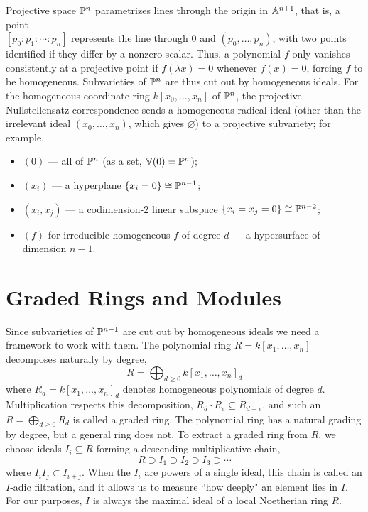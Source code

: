 \documentclass[12pt]{amsproc}
\begin{document}
    Projective space $\P^n$ parametrizes lines through the origin in $\A^{n+1}$, that is, a point \\ $[p_0: p_1: \cdots : p_{n}]$ represents the line through $0$ and $(p_0, \ldots, p_n)$, with two points identified if they differ by a nonzero scalar. Thus, a polynomial $f$ only vanishes consistently at a projective point if $f(\lambda x) = 0$ whenever $f(x) = 0$, forcing $f$ to be homogeneous. Subvarieties of $\P^n$ are thus cut out by homogeneous ideals. For the homogeneous coordinate ring $k[x_0, \ldots, x_n]$ of $\P^n$, the projective Nullstellensatz correspondence sends a homogeneous radical ideal (other than the irrelevant ideal $(x_0, \ldots, x_n)$, which gives $\varnothing$) to a projective subvariety; for example,
   \begin{itemize}[topsep=2pt,itemsep=1pt]
        \item $(0)$ --- all of $\P^n$ (as a set, $\V(0) = \P^n$);
        \item $(x_i)$ --- a hyperplane $\{x_i = 0\} \iso \P^{n-1}$;
        \item $(x_i, x_j)$ --- a codimension-$2$ linear subspace $\{x_i = x_j = 0\} \iso \P^{n-2}$;
        \item $(f)$ for irreducible homogeneous $f$ of degree $d$ --- a hypersurface of dimension $n-1$.
    \end{itemize}
 


\section{Graded Rings and Modules}
    Since subvarieties of $\P^{n-1}$ are cut out by homogeneous ideals we need a framework to work with them. The polynomial ring $R = k[x_1, \ldots, x_n]$ decomposes naturally by degree, 
    \[R = \bigoplus_{d \geq 0} k[x_1, \ldots, x_n]_d\]
    where $R_d = k[x_1, \ldots, x_n]_d$ denotes homogeneous polynomials of degree $d$.  Multiplication respects this decomposition, $R_d \cdot R_e \subseteq R_{d+e}$, and such an $R = \bigoplus_{d \geq 0} R_d$ is called a graded ring. The polynomial ring has a natural grading by degree, but a general ring does not. To extract a graded ring from $R$, we choose ideals $I_i \subseteq R$ forming a descending multiplicative chain,
    \[R \supset I_1 \supset I_2 \supset I_3 \supset \cdots\]
    where $I_iI_j \subset I_{i+j}$. When the $I_i$ are powers of a single ideal, this chain is called an $I$-adic filtration, and it allows us to measure ``how deeply" an element lies in $I$. For our purposes, $I$ is always the maximal ideal of a local Noetherian ring $R$.
\end{document}
